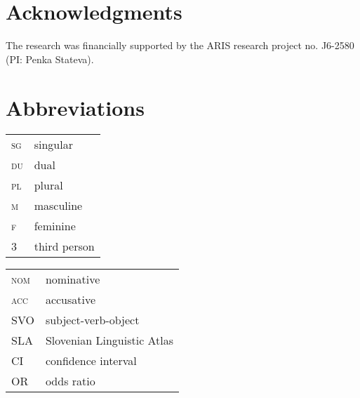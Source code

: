\documentclass[output=paper,colorlinks,citecolor=brown]{langscibook}
\begin{document}
\section*{Acknowledgments}
The research was financially supported by the ARIS research project  no. J6-2580 (PI: Penka Stateva).

\section*{Abbreviations}

\begin{tabularx}{.5\textwidth}{@{}lQ}
\textsc{sg}&singular\\
\textsc{du}&dual\\
\textsc{pl}&plural\\
\textsc{m}&masculine\\
\textsc{f}&feminine\\
\textsc{3}&third person\\
\end{tabularx}%
\begin{tabularx}{.5\textwidth}{lQ@{}}
\textsc{nom}&nominative\\
\textsc{acc}&accusative\\
\textsc{SVO}&subject-verb-object\\
\textsc{SLA}&Slovenian Linguistic Atlas\\
\textsc{CI}&confidence interval\\
\textsc{OR}&odds ratio\\
\end{tabularx}

\printbibliography[heading=subbibliography,notkeyword=this]
\end{document}
